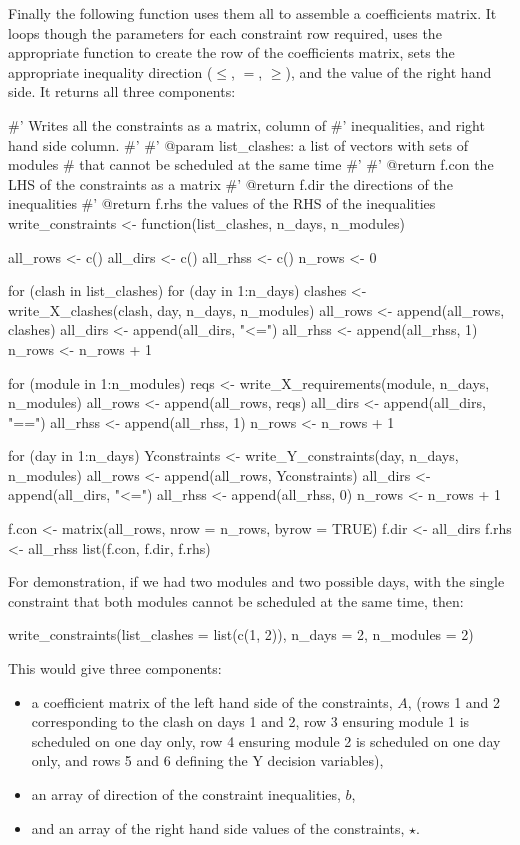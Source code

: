 Finally the following function uses them all to assemble a coefficients matrix.
It loops though the parameters for each constraint row required, uses the
appropriate function to create the row of the coefficients matrix, sets the
appropriate inequality direction ($\leq$, $=$, $\geq$), and the value of the
right hand side.
It returns all three components:

\begin{Rin}
#' Writes all the constraints as a matrix, column of
#' inequalities, and right hand side column.
#'
#' @param list_clashes: a list of vectors with sets of modules
#         that cannot be scheduled at the same time
#'
#' @return f.con the LHS of the constraints as a matrix
#' @return f.dir the directions of the inequalities
#' @return f.rhs the values of the RHS of the inequalities
write_constraints <- function(list_clashes, n_days, n_modules){
  all_rows <- c()
  all_dirs <- c()
  all_rhss <- c()
  n_rows <- 0
  
  for (clash in list_clashes){
    for (day in 1:n_days){
      clashes <- write_X_clashes(clash, day, n_days, n_modules)
      all_rows <- append(all_rows, clashes)
      all_dirs <- append(all_dirs, "<=")
      all_rhss <- append(all_rhss, 1)
      n_rows <- n_rows + 1
    }
  }
  
  for (module in 1:n_modules){
    reqs <- write_X_requirements(module, n_days, n_modules)
    all_rows <- append(all_rows, reqs)
    all_dirs <- append(all_dirs, "==")
    all_rhss <- append(all_rhss, 1)
    n_rows <- n_rows + 1
  }
  
  for (day in 1:n_days){
    Yconstraints <- write_Y_constraints(day, n_days, n_modules)
    all_rows <- append(all_rows, Yconstraints)
    all_dirs <- append(all_dirs, "<=")
    all_rhss <- append(all_rhss, 0)
    n_rows <- n_rows + 1
  }
  
  f.con <- matrix(all_rows, nrow = n_rows, byrow = TRUE)
  f.dir <- all_dirs
  f.rhs <- all_rhss
  list(f.con, f.dir, f.rhs)
}
\end{Rin}

For demonstration, if we had two modules and two possible days, with the single
constraint that both modules cannot be scheduled at the same time, then:

\begin{Rin}
write_constraints(list_clashes = list(c(1, 2)),
                  n_days = 2,
                  n_modules = 2)
\end{Rin}

This would give three components:
\begin{itemize}
  \item a coefficient matrix of the left hand side of the constraints, $A$, (rows 1
  and 2 corresponding to the clash on days 1 and 2, row 3 ensuring module 1 is
  scheduled on one day only, row 4 ensuring module 2 is scheduled on one day
  only, and rows 5 and 6 defining the Y decision variables),
  \item an array of direction of the constraint inequalities, $b$,
  \item and an array of the right hand side values of the constraints, $\star$.
\end{itemize}

